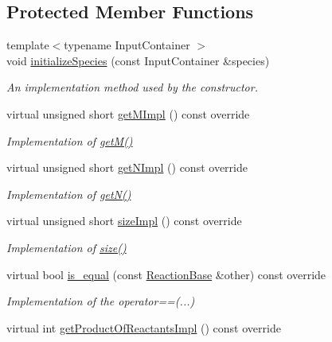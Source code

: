 \subsection*{Protected Member Functions}
\begin{DoxyCompactItemize}
\item 
{\footnotesize template$<$typename Input\+Container $>$ }\\void \hyperlink{classReaction_a7b2364ff7c1f2d46bc61c570c3ffdd78}{initialize\+Species} (const Input\+Container \&species)
\begin{DoxyCompactList}\small\item\em An implementation method used by the constructor. \end{DoxyCompactList}\item 
virtual unsigned short \hyperlink{classReaction_a9e6b47f63444fd3d99037894b0030083}{get\+M\+Impl} () const override
\begin{DoxyCompactList}\small\item\em Implementation of \hyperlink{classReactionBase_ab64c6fdaa70414966bcb2c181e10ac36}{get\+M()} \end{DoxyCompactList}\item 
virtual unsigned short \hyperlink{classReaction_adbb69e4098e63bba4d6e1ea7e4c1c774}{get\+N\+Impl} () const override
\begin{DoxyCompactList}\small\item\em Implementation of \hyperlink{classReactionBase_a8b59e0a9b41fa700cb73483c6d502802}{get\+N()} \end{DoxyCompactList}\item 
virtual unsigned short \hyperlink{classReaction_afd2870d15d6a0624b386be050218367e}{size\+Impl} () const override
\begin{DoxyCompactList}\small\item\em Implementation of \hyperlink{classReactionBase_a536de7a485ea3b0188093e113af66b8c}{size()} \end{DoxyCompactList}\item 
virtual bool \hyperlink{classReaction_acdf51c7fbfa6918f05abb136ab661b76}{is\+\_\+equal} (const \hyperlink{classReactionBase}{Reaction\+Base} \&other) const override
\begin{DoxyCompactList}\small\item\em Implementation of the operator==(...) \end{DoxyCompactList}\item 
virtual int \hyperlink{classReaction_a9c9211467d59cbcdd98a338a43551b08}{get\+Product\+Of\+Reactants\+Impl} () const override

\end{DoxyCompactItemize}
